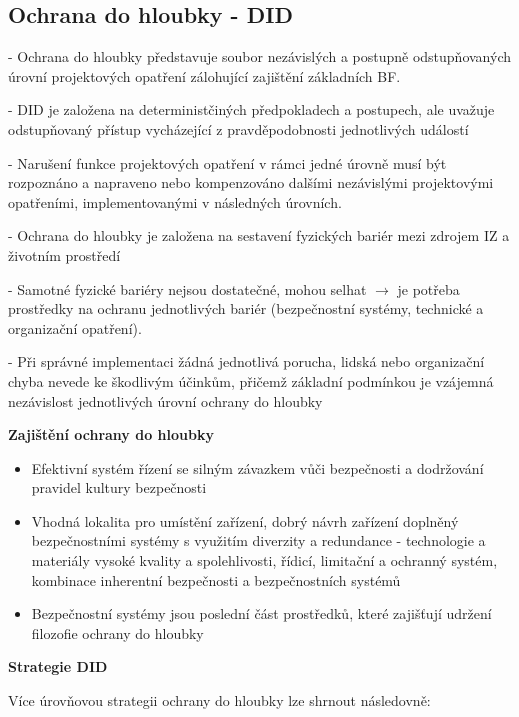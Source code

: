 \subsection{Ochrana do hloubky - DID}

\noindent - Ochrana do hloubky představuje soubor nezávislých a postupně odstupňovaných úrovní projektových opatření zálohující zajištění základních BF.

\noindent - DID je založena na deterministčiných předpokladech a postupech, ale uvažuje odstupňovaný přístup vycházející z pravděpodobnosti jednotlivých událostí

\noindent - Narušení funkce projektových opatření v rámci jedné úrovně musí být rozpoznáno a napraveno nebo kompenzováno dalšími nezávislými projektovými opatřeními, implementovanými v následných úrovních.

\noindent - Ochrana do hloubky je založena na sestavení fyzických bariér mezi zdrojem IZ a životním prostředí

\noindent - Samotné fyzické bariéry nejsou dostatečné, mohou selhat $\rightarrow$ je potřeba prostředky na ochranu jednotlivých bariér (bezpečnostní systémy, technické a organizační opatření).

\noindent - Při správné implementaci žádná jednotlivá porucha, lidská nebo organizační chyba nevede ke škodlivým účinkům, přičemž základní podmínkou je vzájemná nezávislost jednotlivých úrovní ochrany do hloubky

\vspace{1ex}

\textbf{Zajištění ochrany do hloubky}

\begin{itemize}
    \item Efektivní systém řízení se silným závazkem vůči bezpečnosti a dodržování pravidel kultury bezpečnosti
    \item Vhodná lokalita pro umístění zařízení, dobrý návrh zařízení doplněný bezpečnostními systémy s využitím diverzity a redundance - technologie a materiály vysoké kvality a spolehlivosti, řídicí, limitační a ochranný systém, kombinace inherentní bezpečnosti a bezpečnostních systémů
    \item 	Bezpečnostní systémy jsou poslední část prostředků, které zajišťují udržení filozofie ochrany do hloubky
\end{itemize}

\textbf{Strategie DID}

Více úrovňovou strategii ochrany do hloubky lze shrnout následovně:


